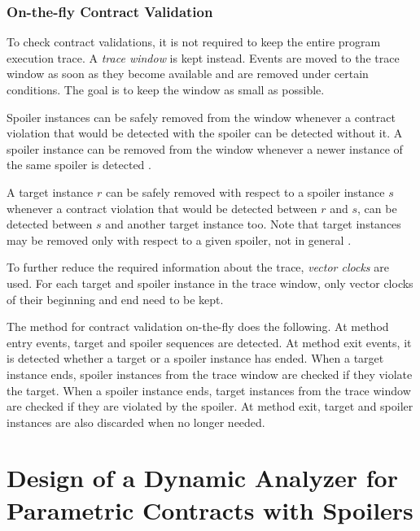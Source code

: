 {\color{blue}\lipsum[2]}

\subsection{On-the-fly Contract Validation}

To check contract validations, it is not required to keep the entire program
execution trace. A \emph{trace window} is kept instead. Events are moved to the
trace window as soon as they become available and are removed under certain
conditions. The goal is to keep the window as small as possible.

Spoiler instances can be safely removed from the window whenever a contract
violation that would be detected with the spoiler can be detected without it. A
spoiler instance can be removed from the window whenever a newer instance of the
same spoiler is detected \cite{contracts}.

A target instance $r$ can be safely removed with respect to a spoiler instance
$s$ whenever a contract violation that would be detected between $r$ and $s$,
can be detected between $s$ and another target instance too. Note that target
instances may be removed only with respect to a given spoiler, not in general
\cite{contracts}.

To further reduce the required information about the trace, \emph{vector clocks}
are used. For each target and spoiler instance in the trace window, only vector
clocks of their beginning and end need to be kept.

The method for contract validation on-the-fly does the following. At method
entry events, target and spoiler sequences are detected. At method exit events,
it is detected whether a target or a spoiler instance has ended. When a target
instance ends, spoiler instances from the trace window are checked if they
violate the target. When a spoiler instance ends, target instances from the
trace window are checked if they are violated by the spoiler. At method exit,
target and spoiler instances are also discarded when no longer needed.

{\color{blue}\lipsum[1-3]}



\chapter{Design of a Dynamic Analyzer for Parametric Contracts with Spoilers}
\label{chFour}

